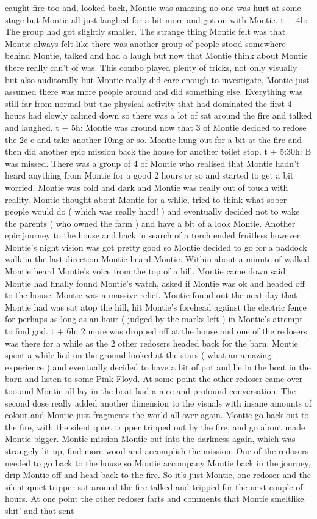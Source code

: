 \documentclass[12pt]{book}
\begin{document}
caught fire too and, looked back, Montie was amazing no one was hurt at some stage but Montie all just laughed for a bit more and got on with Montie. t + 4h: The group had got slightly smaller. The strange thing Montie felt was that Montie always felt like there was another group of people stood somewhere behind Montie, talked and had a laugh but now that Montie think about Montie there really can't of was. This combo played plenty of tricks, not only visually but also auditorally but Montie really did care enough to investigate, Montie just assumed there was more people around and did something else. Everything was still far from normal but the physical activity that had dominated the first 4 hours had slowly calmed down so there was a lot of sat around the fire and talked and laughed. t + 5h: Montie was around now that 3 of Montie decided to redose the 2c-e and take another 10mg or so. Montie hung out for a bit at the fire and then did another epic mission back the house for another toilet stop. t + 5:30h: B was missed. There was a group of 4 of Montie who realised that Montie hadn't heard anything from Montie for a good 2 hours or so and started to get a bit worried. Montie was cold and dark and Montie was really out of touch with reality. Montie thought about Montie for a while, tried to think what sober people would do ( which was really hard! ) and eventually decided not to wake the parents ( who owned the farm ) and have a bit of a look Montie. Another epic journey to the house and back in search of a torch ended fruitless however Montie's night vision was got pretty good so Montie decided to go for a paddock walk in the last direction Montie heard Montie. Within about a minute of walked Montie heard Montie's voice from the top of a hill. Montie came down said Montie had finally found Montie's watch, asked if Montie was ok and headed off to the house. Montie was a massive relief. Montie found out the next day that Montie had was sat atop the hill, hit Montie's forehead against the electric fence for perhaps as long as an hour ( judged by the marks left ) in Montie's attempt to find god. t + 6h: 2 more was dropped off at the house and one of the redosers was there for a while as the 2 other redosers headed back for the barn. Montie spent a while lied on the ground looked at the stars ( what an amazing experience ) and eventually decided to have a bit of pot and lie in the boat in the barn and listen to some Pink Floyd. At some point the other redoser came over too and Montie all lay in the boat had a nice and profound conversation. The second dose really added another dimension to the visuals with insane amounts of colour and Montie just fragments the world all over again. Montie go back out to the fire, with the silent quiet tripper tripped out by the fire, and go about made Montie bigger. Montie mission Montie out into the darkness again, which was strangely lit up, find more wood and accomplish the mission. One of the redosers needed to go back to the house so Montie accompany Montie back in the journey, drip Montie off and head back to the fire. So it's just Montie, one redoser and the silent quiet tripper sat around the fire talked and tripped for the next couple of hours. At one point the other redoser farts and comments that Montie smeltlike shit' and that sent 
\end{document}
